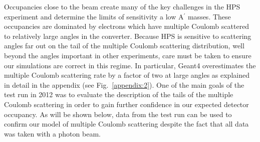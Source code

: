 Occupancies close to the beam create many of the key challenges in the HPS experiment
and determine the limits of sensitivity a low A$^\prime$ masses.
These occupancies are dominated by electrons which have multiple Coulomb scattered to relatively large angles in the converter. Because HPS is sensitive to scattering angles far out on the tail of the multiple Coulomb scattering distribution, well beyond the angles important in other experiments, care must be taken
to ensure our simulations are correct in this regime.  In particular,
Geant4 overestimates the multiple Coulomb scattering rate by a factor of two  
at large angles as explained in detail in the appendix (see Fig.~\ref{appendix:2}).
One of the main goals of the test run in 2012 was to evaluate the description of the tails of the multiple Coulomb scattering in order 
to gain further confidence in our expected detector occupancy. As will be shown below, data from the 
test run can be used to confirm our model of multiple Coulomb scattering despite the fact that 
all data was taken with a photon beam.

